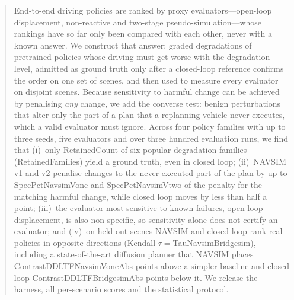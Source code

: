 \begin{abstract}
End-to-end driving policies are ranked by proxy evaluators---open-loop displacement, non-reactive
and two-stage pseudo-simulation---whose rankings have so far only been compared with each other,
never with a known answer.
We construct that answer: graded degradations of pretrained policies whose driving must get worse
with the degradation level, admitted as ground truth only after a closed-loop reference confirms the
order on one set of scenes, and then used to measure every evaluator on disjoint scenes.
Because sensitivity to harmful change can be achieved by penalising \emph{any} change, we add the
converse test: benign perturbations that alter only the part of a plan that a replanning vehicle never
executes, which a valid evaluator must ignore.
Across four policy families with up to three seeds, five evaluators and over three hundred evaluation runs, we
find that
(i)~only \num{RetainedCount} of six popular degradation families (\num{RetainedFamilies}) yield a
ground truth, even in closed loop;
(ii)~NAVSIM v1 and v2 penalise changes to the never-executed part of the plan by up to
\num{SpecPctNavsimVone} and \num{SpecPctNavsimVtwo} of the penalty for the matching harmful change,
while closed loop moves by less than half a point;
(iii)~the evaluator most sensitive to known failures, open-loop displacement, is also non-specific, so
sensitivity alone does not certify an evaluator; and
(iv)~on held-out scenes NAVSIM and closed loop rank real policies in opposite directions
(Kendall $\tau={}$\num{TauNavsimBridgesim}), including a state-of-the-art diffusion planner that NAVSIM
places \num{ContrastDDLTFNavsimVoneAbs} points above a simpler baseline and closed loop
\num{ContrastDDLTFBridgesimAbs} points below it.
We release the harness, all per-scenario scores and the statistical protocol.
\end{abstract}
